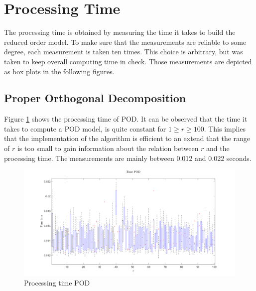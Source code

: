 \section{Processing Time}
The processing time is obtained by measuring the time it takes to build the reduced order model.
To make sure that the measurements are reliable to some degree, each measurement is taken ten times.
This choice is arbitrary, but was taken to keep overall computing time in check.
Those measurements are depicted as box plots in the following figures.

\subsection{Proper Orthogonal Decomposition}
Figure \ref{FIG-T-POD} shows the processing time of POD.
It can be observed that the time it takes to compute a POD model, is quite constant for  \(1 \geq r \geq 100\).
This implies that the implementation of the algorithm is efficient to an extend that the range of \(r\) is too small to gain information about the relation between \(r\) and the processing time.
The measurements are mainly between 0.012 and 0.022 seconds.
\begin{figure}[H]
\centering
\includegraphics[width=\textwidth]{images/time/POD}
\caption{Processing time POD}
\label{FIG-T-POD}
\end{figure}



